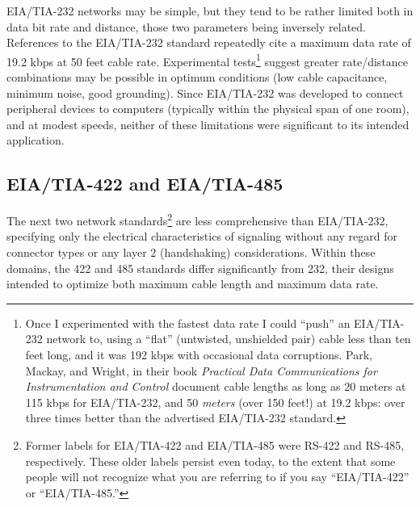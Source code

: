 EIA/TIA-232 networks may be simple, but they tend to be rather limited both in data bit rate and distance, those two parameters being inversely related.  References to the EIA/TIA-232 standard repeatedly cite a maximum data rate of 19.2 kbps at 50 feet cable rate.  Experimental tests\footnote{Once I experimented with the fastest data rate I could ``push'' an EIA/TIA-232 network to, using a ``flat'' (untwisted, unshielded pair) cable less than ten feet long, and it was 192 kbps with occasional data corruptions.  Park, Mackay, and Wright, in their book \textit{Practical Data Communications for Instrumentation and Control} document cable lengths as long as 20 meters at 115 kbps for EIA/TIA-232, and 50 \textit{meters} (over 150 feet!) at 19.2 kbps: over three times better than the advertised EIA/TIA-232 standard.} suggest greater rate/distance combinations may be possible in optimum conditions (low cable capacitance, minimum noise, good grounding).  Since EIA/TIA-232 was developed to connect peripheral devices to computers (typically within the physical span of one room), and at modest speeds, neither of these limitations were significant to its intended application.












\filbreak
\subsection{EIA/TIA-422 and EIA/TIA-485}

The next two network standards\footnote{Former labels for EIA/TIA-422 and EIA/TIA-485 were RS-422 and RS-485, respectively.  These older labels persist even today, to the extent that some people will not recognize what you are referring to if you say ``EIA/TIA-422'' or ``EIA/TIA-485.''} are less comprehensive than EIA/TIA-232, specifying only the electrical characteristics of signaling without any regard for connector types or any layer 2 (handshaking) considerations.  Within these domains, the 422 and 485 standards differ significantly from 232, their designs intended to optimize both maximum cable length and maximum data rate.        


